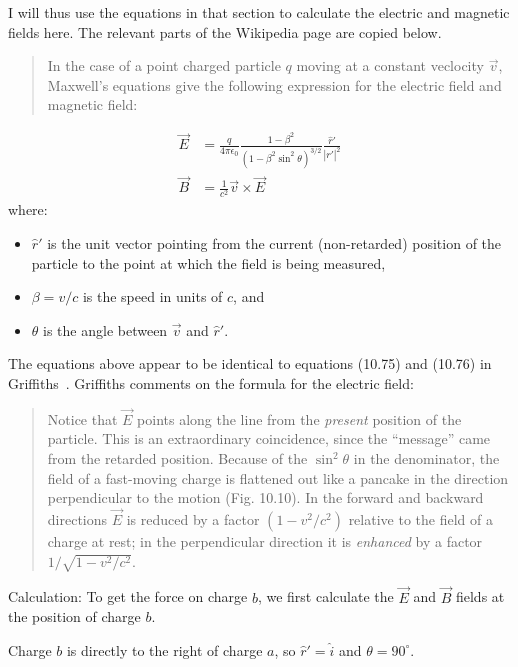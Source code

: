 \documentclass[a4paper]{article}
\theoremstyle{plain}
\theoremstyle{definition}
\newcommand{\rhat}{\hat{r}}
\newcommand{\vect}[1]{\vec{#1}}
\newcommand{\hatvec}[1]{\hat{#1}}
\newcommand{\ihat}{\hatvec{i}}
\begin{document}
I will thus use the equations in that section to calculate the
electric and magnetic fields here.  The relevant parts of the
Wikipedia page are copied below.

\begin{quote}
In the case of a point charged particle $q$ moving at a constant
veclocity $\vect{v}$, Maxwell's equations give the following
expression for the electric field and magnetic field:
\end{quote}
\begin{align}
\vect{E} & = \frac{q}{4 \pi \epsilon_0} \frac{1-\beta^2}{(1-\beta^2 \sin^2 \theta)^{3/2}} \frac{{\rhat}'}{|r'|^2} \label{eq:EforPtChg} \\
\vect{B} & = \frac{1}{c^2} \vect{v} \times \vect{E} \label{eq:BforPtChg}
\end{align}
where:
\begin{itemize}
    \item ${\rhat}'$ is the unit vector pointing from the current
      (non-retarded) position of the particle to the point at which
      the field is being measured,
    \item $\beta = v/c$ is the speed in units of $c$, and
    \item $\theta$ is the angle between $\vect{v}$ and ${\rhat}'$.
\end{itemize}

The equations above appear to be identical to equations (10.75) and
(10.76) in Griffiths~\cite{Griffiths1998}.  Griffiths comments on the formula for the electric field:

\begin{quote}
Notice that $\vect{E}$ points along the line from the {\em present}
position of the particle.  This is an extraordinary coincidence, since
the ``message'' came from the retarded position.  Because of the
$\sin^2 \theta$ in the denominator, the field of a fast-moving charge
is flattened out like a pancake in the direction perpendicular to the
motion (Fig. 10.10).  In the forward and backward directions
$\vect{E}$ is reduced by a factor $(1 - v^2/c^2)$ relative to the
field of a charge at rest; in the perpendicular direction it is
{\em enhanced} by a factor $1 / \sqrt{ 1 - v^2/c^2}$.
\end{quote}

Calculation: To get the force on charge $b$, we first calculate the
$\vect{E}$ and $\vect{B}$ fields at the position of charge $b$.

Charge $b$ is directly to the right of charge $a$, so ${\rhat}' = \ihat$
and $\theta = 90^{\circ}$.
\end{document}
